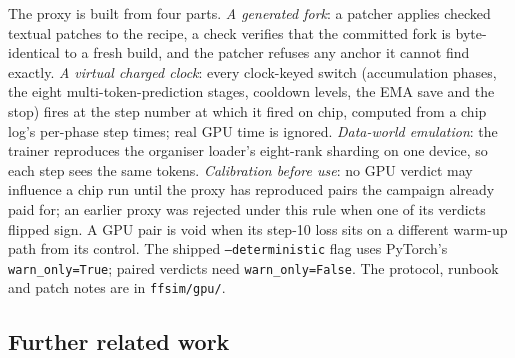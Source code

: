 The proxy is built from four parts. \emph{A generated fork}: a patcher applies \docnum{} checked
textual patches to the recipe, a check verifies that the committed fork is byte-identical to a fresh build, and the
patcher refuses any anchor it cannot find exactly. \emph{A virtual charged clock}: every clock-keyed switch
(accumulation phases, the eight multi-token-prediction stages, cooldown levels, the EMA save and the stop) fires at the
step number at which it fired on chip, computed from a chip log's per-phase step times; real GPU time is ignored.
\emph{Data-world emulation}: the trainer reproduces the organiser loader's eight-rank sharding on one device, so each
step sees the same tokens. \emph{Calibration before use}: no GPU verdict may influence a chip run until the proxy has
reproduced pairs the campaign already paid for; an earlier proxy was rejected under this rule when one of its verdicts
flipped sign. A GPU pair is void when its step-10 loss sits on a different warm-up path from its control. The shipped
\texttt{--deterministic} flag uses PyTorch's \texttt{warn\_only=True}; paired verdicts need \texttt{warn\_only=False}.
The protocol, runbook and patch notes are in \texttt{ffsim/gpu/}.

\subsection{Further related work}
\label{app:related-recipe}

